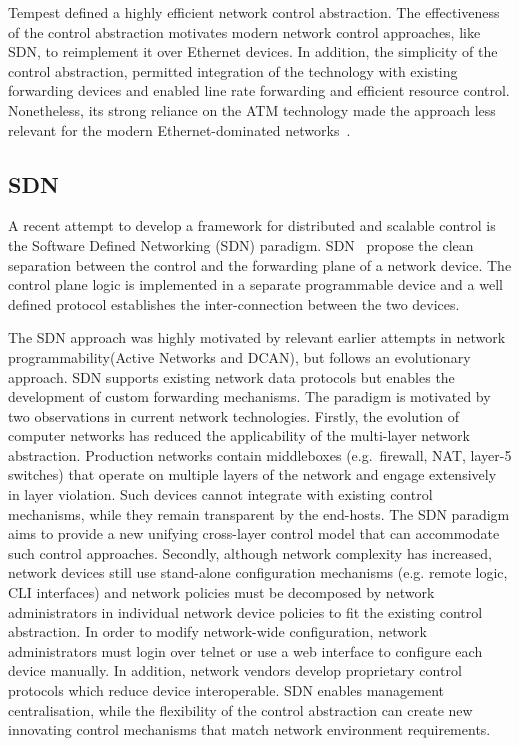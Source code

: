 Tempest defined a highly efficient network control abstraction. The
effectiveness of the control abstraction motivates modern network control
approaches, like SDN, to reimplement it over Ethernet devices.  In addition, the
simplicity of the control abstraction, permitted integration of the technology
with existing forwarding devices  and enabled line rate forwarding and efficient
resource control.  Nonetheless, its strong reliance on the ATM technology made
the approach less relevant for the modern Ethernet-dominated networks~\cite{Crosby2002}. 

\subsection{SDN}\label{sec:background:sdn} 

A recent attempt to develop a framework for distributed and scalable control is
the Software Defined Networking (SDN) paradigm. SDN~\cite{sdn} propose the clean
separation between the control and the forwarding plane of a network device. The
control plane logic is implemented in a separate programmable device and a well
defined protocol establishes the inter-connection between the two devices. 

The SDN approach was highly motivated by relevant earlier attempts in network
programmability(Active Networks and DCAN), but follows an evolutionary approach.
SDN supports existing network data protocols but enables the development of
custom forwarding mechanisms.  The paradigm is motivated by two observations in
current network technologies.  Firstly, the evolution of computer networks has
reduced the applicability of the multi-layer network abstraction. Production
networks contain middleboxes (e.g.~firewall, NAT, layer-5 switches) that operate
on multiple layers of the network and engage extensively in layer violation.
Such devices cannot integrate with existing control mechanisms, while they
remain transparent by the end-hosts. The SDN paradigm aims to provide a new
unifying cross-layer control model that can accommodate such control approaches.
Secondly, although network complexity has increased, network devices still use
stand-alone configuration mechanisms (e.g.  remote logic, CLI interfaces) and
network policies must be decomposed by network administrators in individual
network device policies to fit the existing control abstraction. In order to
modify network-wide configuration, network administrators must login over telnet
or use a web interface to configure each device manually.  In addition, network
vendors develop proprietary control protocols which reduce device interoperable.
SDN enables management centralisation, while the flexibility of the control
abstraction can create new innovating control mechanisms that match network
environment requirements.

